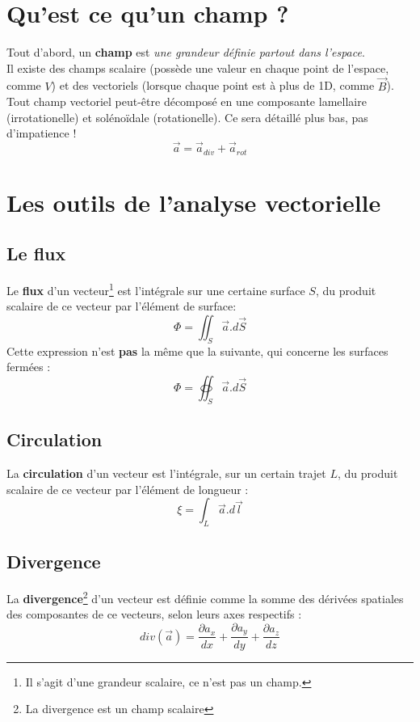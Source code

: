 \documentclass[british,french,11pt, a4paper, openany]{book}
\begin{document}
		\section{Qu'est ce qu'un champ ?}
		Tout d'abord, un \textbf{champ} est \textit{une grandeur définie partout dans l'espace}.\\
		Il existe des champs scalaire (possède une valeur en chaque point de l'espace, comme $V$) et des vectoriels (lorsque chaque point est à plus de 1D, comme $\vec{B}$).\\
		Tout champ vectoriel peut-être décomposé en une composante lamellaire (irrotationelle) et solénoïdale (rotationelle). Ce sera détaillé plus bas, pas d'impatience ! 
		\begin{equation}
		\vec{a} = \vec{a}_{div} + \vec{a}_{rot}
		\end{equation}
		
		\section{Les outils de l'analyse vectorielle}
		\subsection{Le flux}
		Le \textbf{flux} d'un vecteur\footnote{Il s'agit d'une grandeur scalaire, ce n'est pas un champ.} est l'intégrale sur une certaine surface $S$, du produit scalaire de ce vecteur par l'élément de surface:
		\begin{equation}
		\Phi = \iint_S \vec{a}.d\vec{S}
		\end{equation}
		Cette expression n'est \textbf{pas} la même que la suivante, qui concerne les surfaces fermées :
		\begin{equation}
		\Phi = \oiint_S \vec{a}.d\vec{S}
		\end{equation}
		
		
		\subsection{Circulation}
		La \textbf{circulation} d'un vecteur est l'intégrale, sur un certain trajet $L$, du produit scalaire de ce vecteur par l'élément de longueur :
		\begin{equation}
		\xi = \int_L \vec{a}.d\vec{l}
		\end{equation}
		
		\subsection{Divergence}
		La \textbf{divergence}\footnote{La divergence est un champ scalaire} d'un vecteur est définie comme la somme des dérivées spatiales des composantes de ce vecteurs, selon leurs axes respectifs :
		\begin{equation}
		div(\vec{a}) = \frac{\partial a_x}{dx} + \frac{\partial a_y}{dy} + \frac{\partial a_z}{dz}
		\end{equation}
		
\end{document}
